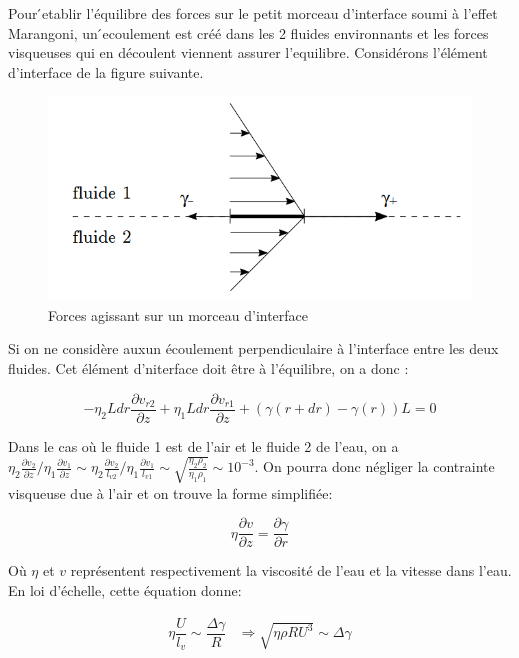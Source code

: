 \documentclass[french, 10pt]{article}
\begin{document}
Pour  ́etablir l'équilibre des forces sur le petit morceau d'interface soumi à l'effet Marangoni, un  ́ecoulement est créé dans les 2 fluides environnants et les forces visqueuses qui en découlent viennent assurer l'equilibre. Considérons l'élément d'interface de la figure suivante.

\begin{figure}[ht]
  \centering
  \includegraphics[width=.5\textwidth]{ecoulementinterface.png}
  \caption{Forces agissant sur un morceau d'interface}
\end{figure}

Si on ne considère auxun écoulement perpendiculaire à l'interface entre les deux fluides. Cet élément d'niterface doit être à l'équilibre, on a donc :

\begin{equation}
-\eta_2Ldr\dfrac{\partial v_{r2}}{\partial z}+\eta_1Ldr\dfrac{\partial v_{r1}}{\partial z}+\left(\gamma(r+dr)-\gamma(r)\right)L=0
\end{equation}

Dans le cas où le fluide 1 est de l'air et le fluide 2 de l'eau, on a $\eta_2\frac{\partial v_2}{\partial z}/\eta_1\frac{\partial v_1}{\partial z}\sim \eta_2\frac{\partial v_2}{l_{v2}}/\eta_1\frac{\partial v_1}{l_{v1}}\sim \sqrt{\frac{\eta_2\rho_2}{\eta_1\rho_1}}\sim 10^{-3}$. On pourra donc négliger la contrainte visqueuse due à l'air et on trouve la forme simplifiée: 

\begin{equation}
  \eta\dfrac{\partial v}{\partial z} = \dfrac{\partial \gamma}{\partial r}
\end{equation}

Où $\eta$ et $v$ représentent respectivement la viscosité de l'eau et la vitesse dans l'eau. En loi d'échelle, cette équation donne: 

\begin{Programme}{}
  \begin{equation}
    \begin{array}{cc}
    \eta\dfrac{U}{l_v}\sim\dfrac{\Delta\gamma}{R} & \Rightarrow \sqrt{\eta\rho RU^3}\sim \Delta\gamma
    \end{array}
  \end{equation}
\end{Programme}
\end{document}
